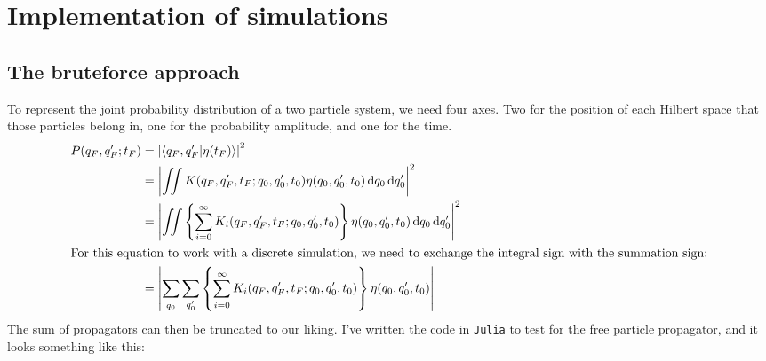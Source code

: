 \chapter{Implementation of simulations}
\label{sec:implementation_of_simulation}

\section{The bruteforce approach}

To represent the joint probability distribution of a two particle system, we need four axes. Two for the position of each Hilbert space that those particles belong in, one for the probability amplitude, and one for the time.
\begin{align}
    P(q_F, q_F'; t_F) &= \left|\braket{q_F, q_F'}{\eta(t_F)}\right|^2 \\
    &= \left|\iint K(q_F, q_F', t_F; q_0, q_0', t_0)\eta(q_0, q_0', t_0)\dd{q_0}\dd{q_0'}\right|^2 \\
    &= \left|\iint \left\{\sum_{i = 0}^{\infty}K_i(q_F, q_F', t_F; q_0, q_0', t_0)\right\}\eta(q_0, q_0', t_0)\dd{q_0}\dd{q_0'}\right|^2 \\
    \intertext{For this equation to work with a discrete simulation, we need to exchange the integral sign with the summation sign:}
    &= \left|\sum_{\vphantom{q_0'}q_0}\sum_{q_0'}\left\{\sum_{\vphantom{q_0'}i = 0}^{\infty}K_i(q_F, q_F', t_F; q_0, q_0', t_0)\right\}\eta(q_0, q_0', t_0)\right|
\end{align}
The sum of propagators can then be truncated to our liking. I've written the code in \texttt{Julia} to test for the free particle propagator, and it looks something like this:
